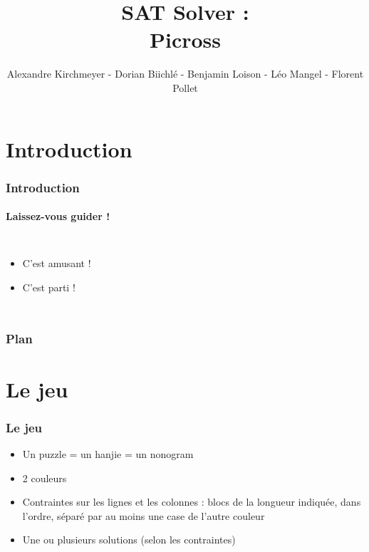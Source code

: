 \documentclass[12pt]{beamer}
\author[The Picross team]{Alexandre Kirchmeyer - Dorian Biichlé - Benjamin Loison - Léo Mangel - Florent Pollet}
\title[Picross SAT Solver]{SAT Solver :\\Picross}
\institute[Mathinfoly]{Mathinfoly}
\begin{document}
\begin{frame}
\titlepage 
{}
\end{frame}




\section[]{Introduction} %

\begin{frame}
\frametitle{Introduction}
\framesubtitle{Laissez-vous guider !}


\begin{columns}

\begin{itemize}
    \item C'est amusant !
    \item C'est parti !
\end{itemize}
\end{columns}

\end{frame}


\begin{frame}
\frametitle{Plan} 
\tableofcontents 
\end{frame}


\section[]{Le jeu}
\begin{frame}
\frametitle{Le jeu}
\begin{itemize}
    \item Un puzzle = un hanjie = un nonogram
    \item 2 couleurs
    \item Contraintes sur les lignes et les colonnes : blocs de la longueur indiquée, dans l'ordre, séparé par au moins une case de l'autre couleur
    \item Une ou plusieurs solutions (selon les contraintes)
\end{itemize}



\end{frame}
\end{document}
